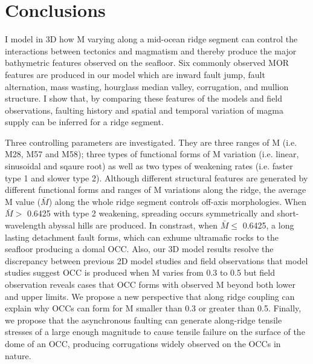 \pagebreak
\section{Conclusions}
I model in 3D how M varying along a mid-ocean ridge segment can control the interactions between tectonics and magmatism and thereby produce the major bathymetric features observed on the seafloor.
Six commonly observed MOR features are produced in our model which are inward fault jump, fault alternation, mass wasting, hourglass median valley, corrugation, and mullion structure. I show that, by comparing these features of the models and field observations, faulting history and spatial and temporal variation of magma supply can be inferred for a ridge segment.

Three controlling parameters are investigated. They are three ranges of M (i.e. M28, M57 and M58); three types of functional forms of M variation (i.e. linear, sinusoidal and sqaure root) as well as two types of weakening rates (i.e. faster type 1 and slower type 2). Although different structural features are generated by different functional forms and ranges of M variations along the ridge, the average M value ($\bar{M}$) along the whole ridge segment controls off-axis morphologies. When $\bar{M} >$ 0.6425 with type 2 weakening, spreading occurs symmetrically and short-wavelength abyssal hills are produced. In constrast, when $\bar{M} \le$ 0.6425, a long lasting detachment fault forms, which can exhume ultramafic rocks to the seafloor producing a domal OCC. Also, our 3D model results resolve the discrepancy between previous 2D model studies and field observations that model studies suggest OCC is produced when M varies from 0.3 to 0.5 but field observation reveals cases that OCC forms with observed M beyond both lower and upper limits. We propose a new perspective that along ridge coupling can explain why OCCs can form for M smaller than 0.3 or greater than 0.5. Finally, we propose that the asynchronous faulting can generate along-ridge tensile stresses of a large enough magnitude to cause tensile failure on the surface of the dome of an OCC, producing corrugations widely observed on the OCCs in nature.





